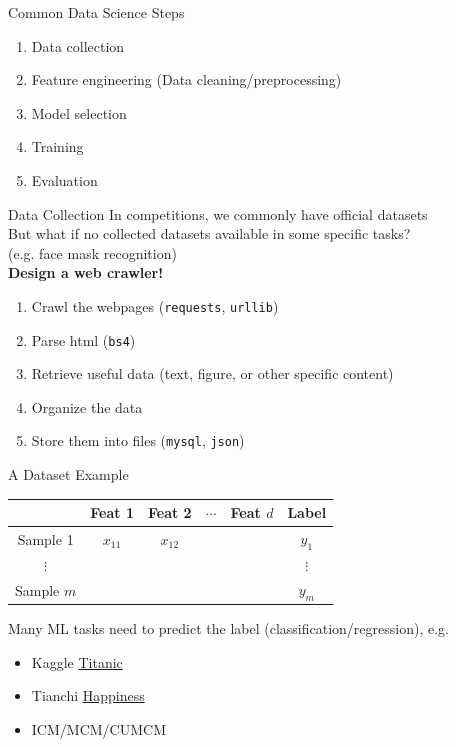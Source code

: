 \documentclass{../TexTemplate/myslide}
\begin{document}
\begin{frame}{Common Data Science Steps}
\begin{enumerate}
	\item Data collection
	\item Feature engineering (Data cleaning/preprocessing)
	\item Model selection
	\item Training
	\item Evaluation
\end{enumerate}
\end{frame}

\begin{frame}[fragile]{Data Collection}
In competitions, we commonly have official datasets\\
But what if no collected datasets available in some specific tasks?\\
(e.g. face mask recognition)\\
\pause
\textbf{Design a web crawler!}
\begin{enumerate}
	\item Crawl the webpages (\verb'requests', \verb'urllib')
	\item Parse html (\verb'bs4')
	\item Retrieve useful data (text, figure, or other specific content)
	\item Organize the data
	\item Store them into files (\verb'mysql', \verb'json')
\end{enumerate}
\end{frame}

\begin{frame}{A Dataset Example}
\begin{center}
\begin{tabular}{cccccc}\hline
 & Feat 1 & Feat 2 & $\cdots$ & Feat $d$ & Label\\\hline
Sample 1 & $x_{11}$ & $x_{12}$ & & & $y_1$ \\\hline
$\vdots$ & & & & & $\vdots$\\\hline
Sample $m$ & & & & & $y_m$ \\\hline
\end{tabular}
\end{center}
Many ML tasks need to predict the label (classification/regression), e.g.
\begin{itemize}
	\item Kaggle \href{https://www.kaggle.com/c/titanic}{Titanic}
	\item Tianchi \href{https://tianchi.aliyun.com/competition/entrance/231702/introduction?spm=5176.12281973.1005.6.3dd524483PJS4q}{Happiness}
	\item ICM/MCM/CUMCM
\end{itemize}
\end{frame}
\end{document}
